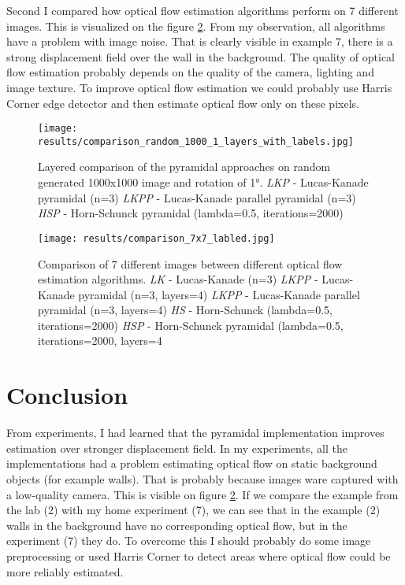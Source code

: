\documentclass[runningheads]{llncs}
\begin{document}
Second I compared how optical flow estimation algorithms perform on 7 different images. This is visualized on the figure \ref{img_1}. From my observation, all algorithms have a problem with image noise. That is clearly visible in example 7, there is a strong displacement field over the wall in the background. The quality of optical flow estimation probably depends on the quality of the camera, lighting and image texture. To improve optical flow estimation we could probably use Harris Corner edge detector and then estimate optical flow only on these pixels. 

\begin{figure}
    \centering
    \texttt{[image: results/comparison\_random\_1000\_1\_layers\_with\_labels.jpg]}
    \caption{Layered comparison of the pyramidal approaches on random generated 1000x1000 image and rotation of \ang{1}.
    \newline 
    \newline\textit{LKP} - Lucas-Kanade pyramidal (n=3)
    \newline\textit{LKPP} - Lucas-Kanade parallel pyramidal (n=3)
    \newline\textit{HSP} - Horn-Schunck pyramidal (lambda=0.5, iterations=2000)}
    \label{img_0}
\end{figure}

\begin{figure} 
    \centering
    \texttt{[image: results/comparison\_7x7\_labled.jpg]}
    \caption{Comparison of 7 different images between different optical flow estimation algorithms.
    \newline
    \newline\textit{LK} - Lucas-Kanade (n=3)
    \newline\textit{LKPP} - Lucas-Kanade pyramidal (n=3, layers=4)
    \newline\textit{LKPP} - Lucas-Kanade parallel pyramidal (n=3, layers=4)
    \newline\textit{HS} - Horn-Schunck (lambda=0.5, iterations=2000)
    \newline\textit{HSP} - Horn-Schunck pyramidal (lambda=0.5, iterations=2000, layers=4}
    \label{img_1}
\end{figure}

\newpage

\section{Conclusion}
From experiments, I had learned that the pyramidal implementation improves estimation over stronger displacement field. In my experiments, all the implementations had a problem estimating optical flow on static background objects (for example walls). That is probably because images ware captured with a low-quality camera. This is visible on figure \ref{img_1}. If we compare the example from the lab (2) with my home experiment (7), we can see that in the example (2) walls in the background have no corresponding optical flow, but in the experiment (7) they do. To overcome this I should probably do some image preprocessing or used Harris Corner to detect areas where optical flow could be more reliably estimated.     
\end{document}
